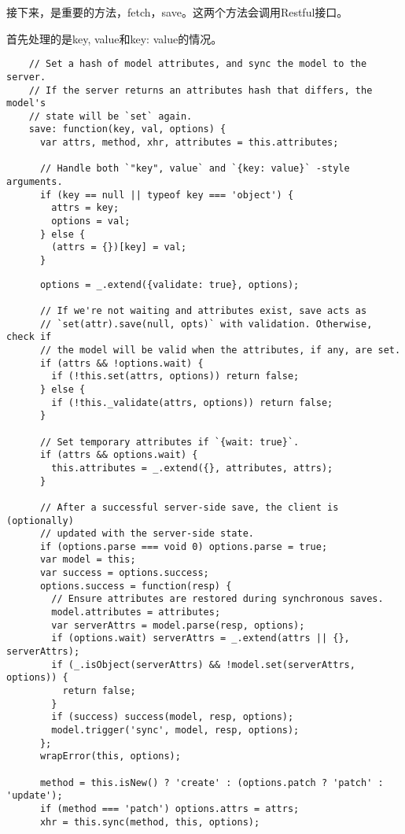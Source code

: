\documentclass[12pt, oneside, b5paper]{book}
\begin{document}
\begin{CJK}{UTF8}{gkai}
  接下来，是重要的方法，fetch，save。这两个方法会调用Restful接口。

  首先处理的是key, value和{key: value}的情况。

  \begin{lstlisting}
    // Set a hash of model attributes, and sync the model to the server.
    // If the server returns an attributes hash that differs, the model's
    // state will be `set` again.
    save: function(key, val, options) {
      var attrs, method, xhr, attributes = this.attributes;

      // Handle both `"key", value` and `{key: value}` -style arguments.
      if (key == null || typeof key === 'object') {
        attrs = key;
        options = val;
      } else {
        (attrs = {})[key] = val;
      }
  \end{lstlisting}

  \begin{lstlisting}
      options = _.extend({validate: true}, options);

      // If we're not waiting and attributes exist, save acts as
      // `set(attr).save(null, opts)` with validation. Otherwise, check if
      // the model will be valid when the attributes, if any, are set.
      if (attrs && !options.wait) {
        if (!this.set(attrs, options)) return false;
      } else {
        if (!this._validate(attrs, options)) return false;
      }

      // Set temporary attributes if `{wait: true}`.
      if (attrs && options.wait) {
        this.attributes = _.extend({}, attributes, attrs);
      }

      // After a successful server-side save, the client is (optionally)
      // updated with the server-side state.
      if (options.parse === void 0) options.parse = true;
      var model = this;
      var success = options.success;
      options.success = function(resp) {
        // Ensure attributes are restored during synchronous saves.
        model.attributes = attributes;
        var serverAttrs = model.parse(resp, options);
        if (options.wait) serverAttrs = _.extend(attrs || {}, serverAttrs);
        if (_.isObject(serverAttrs) && !model.set(serverAttrs, options)) {
          return false;
        }
        if (success) success(model, resp, options);
        model.trigger('sync', model, resp, options);
      };
      wrapError(this, options);

      method = this.isNew() ? 'create' : (options.patch ? 'patch' : 'update');
      if (method === 'patch') options.attrs = attrs;
      xhr = this.sync(method, this, options);


\end{lstlisting}
\end{CJK}
\end{document}
